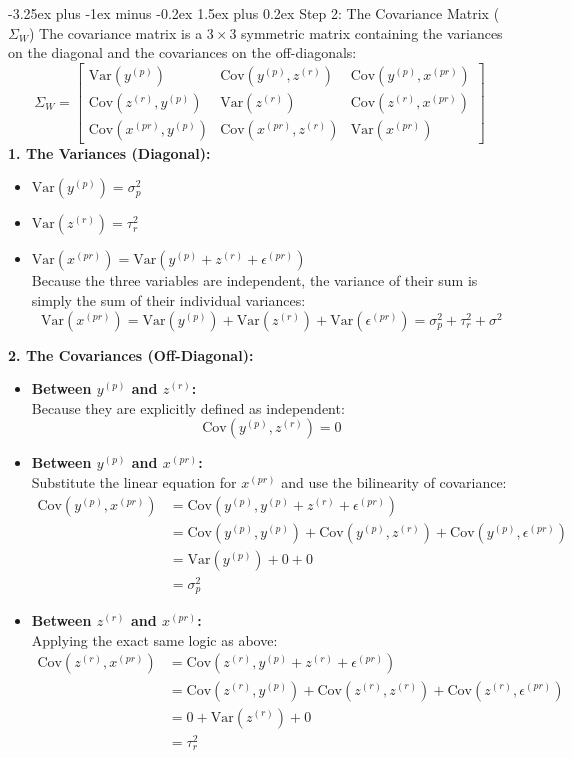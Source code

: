 \documentclass[twoside, 10pt]{article}
\makeatletter
\renewcommand{\paragraph}{\@startsection{paragraph}{4}{0pt}%
    {-3.25ex plus -1ex minus -0.2ex}%
    {1.5ex plus 0.2ex}%
    {\normalfont\normalsize\bfseries}}
\makeatother
\begin{document}
\paragraph{Step 2: The Covariance Matrix ($\Sigma_W$)}
The covariance matrix is a $3 \times 3$ symmetric matrix containing the variances on the diagonal and the covariances on the off-diagonals:
\[
\Sigma_W = \begin{bmatrix} 
\text{Var}(y^{(p)}) & \text{Cov}(y^{(p)}, z^{(r)}) & \text{Cov}(y^{(p)}, x^{(pr)}) \\ 
\text{Cov}(z^{(r)}, y^{(p)}) & \text{Var}(z^{(r)}) & \text{Cov}(z^{(r)}, x^{(pr)}) \\ 
\text{Cov}(x^{(pr)}, y^{(p)}) & \text{Cov}(x^{(pr)}, z^{(r)}) & \text{Var}(x^{(pr)}) 
\end{bmatrix}
\]
\noindent\textbf{1. The Variances (Diagonal):}
\begin{itemize}
    \item $\text{Var}(y^{(p)}) = \sigma_p^2$
    \item $\text{Var}(z^{(r)}) = \tau_r^2$
    \item $\text{Var}(x^{(pr)}) = \text{Var}(y^{(p)} + z^{(r)} + \epsilon^{(pr)})$ \\
    Because the three variables are independent, the variance of their sum is simply the sum of their individual variances:
    \[
    \text{Var}(x^{(pr)}) = \text{Var}(y^{(p)}) + \text{Var}(z^{(r)}) + \text{Var}(\epsilon^{(pr)}) = \sigma_p^2 + \tau_r^2 + \sigma^2
    \]
\end{itemize}
\noindent\textbf{2. The Covariances (Off-Diagonal):}
\begin{itemize}
    \item \textbf{Between $y^{(p)}$ and $z^{(r)}$:} \\
    Because they are explicitly defined as independent:
    \[
    \text{Cov}(y^{(p)}, z^{(r)}) = 0
    \]
    \item \textbf{Between $y^{(p)}$ and $x^{(pr)}$:} \\
    Substitute the linear equation for $x^{(pr)}$ and use the bilinearity of covariance:
    \begin{align*}
    \text{Cov}(y^{(p)}, x^{(pr)}) &= \text{Cov}(y^{(p)}, y^{(p)} + z^{(r)} + \epsilon^{(pr)}) \\
    &= \text{Cov}(y^{(p)}, y^{(p)}) + \text{Cov}(y^{(p)}, z^{(r)}) + \text{Cov}(y^{(p)}, \epsilon^{(pr)}) \\
    &= \text{Var}(y^{(p)}) + 0 + 0 \\
    &= \sigma_p^2
    \end{align*}
    \item \textbf{Between $z^{(r)}$ and $x^{(pr)}$:} \\
    Applying the exact same logic as above:
    \begin{align*}
    \text{Cov}(z^{(r)}, x^{(pr)}) &= \text{Cov}(z^{(r)}, y^{(p)} + z^{(r)} + \epsilon^{(pr)}) \\
    &= \text{Cov}(z^{(r)}, y^{(p)}) + \text{Cov}(z^{(r)}, z^{(r)}) + \text{Cov}(z^{(r)}, \epsilon^{(pr)}) \\
    &= 0 + \text{Var}(z^{(r)}) + 0 \\
    &= \tau_r^2
    \end{align*}
\end{itemize}
\end{document}
